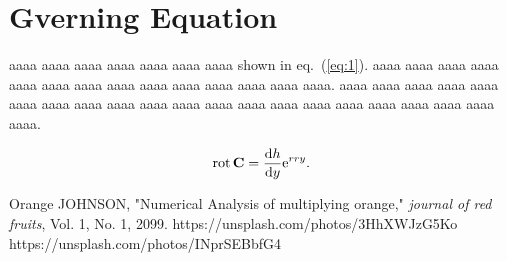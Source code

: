 \documentclass[dvipdfmx,a4j,11pt]{article}
\begin{document}
%
%
%
\section{Gverning Equation}
%
%
% 
aaaa aaaa aaaa aaaa aaaa aaaa aaaa 
shown in eq.~(\ref{eq:1}).   
aaaa aaaa aaaa aaaa aaaa aaaa aaaa 
aaaa aaaa aaaa aaaa aaaa aaaa aaaa. 
aaaa aaaa aaaa aaaa aaaa aaaa aaaa 
aaaa aaaa aaaa aaaa aaaa aaaa aaaa 
aaaa aaaa aaaa aaaa aaaa aaaa aaaa. 

\begin{equation}
	\label{eq:1}
	\operatorname{rot} {\bf C} = \frac{{\rm d} h}{{\rm d} y} {\rm e}^{rry}.
\end{equation}

%
%
%
\begin{thebibliography}{99}
	 Orange JOHNSON, "Numerical Analysis of multiplying orange," {\it journal of red fruits}, Vol. 1, No. 1, 2099.
	 https://unsplash.com/photos/3HhXWJzG5Ko
	 https://unsplash.com/photos/INprSEBbfG4
\end{thebibliography}
%
%
%
\end{document}
